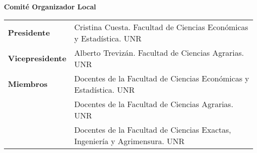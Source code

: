 \documentclass[12pt,a4paper]{article}
\renewcommand{\headrulewidth}{0.4pt}
\renewcommand{\footrulewidth}{0.4pt}
\newcommand{\Footer}{17 al 20 de octubre 2017. Rosario, Argentina}
\newcommand{\SetHeader}[2]{
	\fancyhead{}
	\fancyhead[LE,RO]{\textit{#1}}
	\fancyhead[RE,LO]{ #2}
	\fancyfoot{}
	\fancyfoot[LE,RO]{\thepage}
	\fancyfoot[RE,LO]{\small{\Footer}}
	\renewcommand{\headrulewidth}{0.4pt}
	\renewcommand{\footrulewidth}{0.4pt}
}
\begin{document}
%


\newpage
\pagestyle{empty}
\setlength\parindent{16pt}

\vspace*{1cm}
\centerline{\textbf{\LARGE{\textcolor{ultramarine}{Comité Organizador Local}}}}
\vspace{1cm}


\bigbreak


\begin{table}[h]
\begin{tabular}{p{2.5cm}p{12cm}}
\textbf{Presidente}     & Cristina Cuesta. Facultad de Ciencias Económicas y Estadística. UNR        \\
\textbf{Vicepresidente} & Alberto Trevizán. Facultad de Ciencias Agrarias. UNR                       \\
\textbf{Miembros}       & Docentes de la Facultad de Ciencias Económicas y Estadística. UNR          \\
\textbf{}               & Docentes de la Facultad de Ciencias Agrarias. UNR                          \\
                        & Docentes de la Facultad de Ciencias Exactas, Ingeniería y Agrimensura. UNR
\end{tabular}
\end{table}
\end{document}

